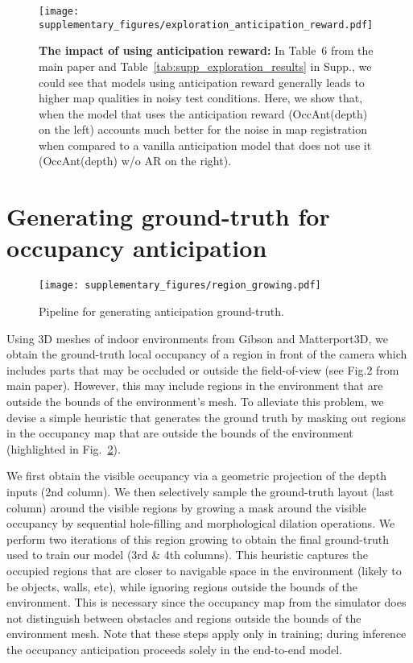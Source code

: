 \documentclass[runningheads]{llncs}
\begin{document}
\begin{figure}
    \centering
    \texttt{[image: supplementary\_figures/exploration\_anticipation\_reward.pdf]}
    \caption{\small \textbf{The impact of using anticipation reward:} In Table~6 from the main paper and Table~\ref{tab:supp_exploration_results} in Supp., we could see that models using anticipation reward generally leads to higher map qualities in noisy test conditions. Here, we show that, when the model that uses the anticipation reward (OccAnt(depth) on the left) accounts much better for the noise in map registration when compared to a vanilla anticipation model that does not use it (OccAnt(depth) w/o AR on the right).}
    \label{fig:exp_occant_anticipation_reward}
\end{figure}



\vfill
\pagebreak


\section{Generating ground-truth for occupancy anticipation}
\label{sec:ground_truth_generation}
\begin{figure}[ht!]
    \centering
    \texttt{[image: supplementary\_figures/region\_growing.pdf]}
    \caption{Pipeline for generating anticipation ground-truth.}
    \label{fig:region_growing_figure}
\end{figure}


Using 3D meshes of indoor environments from Gibson and Matterport3D, we obtain the ground-truth local occupancy of a  region in front of the camera which includes parts that may be occluded or outside the field-of-view (see Fig.2 from main paper). However, this may include regions in the environment that are outside the bounds of the environment's mesh. To alleviate this problem, we devise a simple heuristic that generates the ground truth by masking out regions in the occupancy map that are outside the bounds of the environment (highlighted in Fig.~\ref{fig:region_growing_figure}). 

We first obtain the visible occupancy via a geometric projection of the depth inputs (2nd column). We then selectively sample the ground-truth layout (last column) around the visible regions by growing a mask around the visible occupancy by sequential hole-filling and morphological dilation operations. We perform two iterations of this region growing to obtain the final ground-truth used to train our model (3rd \& 4th columns). This heuristic captures the occupied regions that are closer to navigable space in the environment (likely to be objects, walls, etc), while ignoring regions outside the bounds of the environment. This is necessary since the occupancy map from the simulator does not distinguish between obstacles and regions outside the bounds of the environment mesh. Note that these steps apply only in training; during inference the occupancy anticipation proceeds solely in the end-to-end model.
\end{document}
